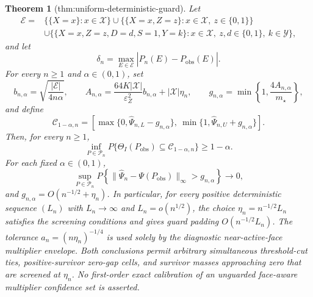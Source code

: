 \documentclass{article}
\newtheorem{theorem}{Theorem}
\begin{document}
\begin{theorem}[thm:uniform-deterministic-guard]\label{thm:uniform-deterministic-guard}
Let
\[
\begin{aligned}
\mathcal E={}&\bigl\{\{X=x\}:x\in\mathcal X\bigr\}
\cup\bigl\{\{X=x,Z=z\}:x\in\mathcal X,\ z\in\{0,1\}\bigr\}\\
&\cup\bigl\{\{X=x,Z=z,D=d,S=1,Y=k\}:x\in\mathcal X,\ z,d\in\{0,1\},\ k\in\mathcal Y\bigr\},
\end{aligned}
\]
and let
\[
\delta_n=\max_{E\in\mathcal E}\left|\widehat P_n(E)-P_{\mathrm{obs}}(E)\right|.
\]
For every \(n\ge1\) and \(\alpha\in(0,1)\), set
\[
b_{n,\alpha}=\sqrt{\frac{|\mathcal E|}{4n\alpha}},\qquad
A_{n,\alpha}=\frac{64K|\mathcal X|}{\varepsilon_Z^2}b_{n,\alpha}+|\mathcal X|\eta_n,
\qquad
g_{n,\alpha}=\min\left\{1,\frac{4A_{n,\alpha}}{m_{\star}}\right\},
\]
and define
\[
\mathcal C_{1-\alpha,n}
=\left[\max\{0,\widehat\Psi_{n,L}-g_{n,\alpha}\},\
\min\{1,\widehat\Psi_{n,U}+g_{n,\alpha}\}\right].
\]
Then, for every \(n\ge1\),
\[
\inf_{P\in\mathcal P_n}P\{\Theta_I(P_{\mathrm{obs}})\subseteq\mathcal C_{1-\alpha,n}\}\ge1-\alpha.
\]
For each fixed \(\alpha\in(0,1)\),
\[
\sup_{P\in\mathcal P_n}
P\!\left\{\|\widehat\Psi_n-\Psi(P_{\mathrm{obs}})\|_\infty>g_{n,\alpha}\right\}\longrightarrow0,
\]
and \(g_{n,\alpha}=O(n^{-1/2}+\eta_n)\).  In particular, for every positive deterministic sequence \((L_n)\) with \(L_n\to\infty\) and \(L_n=o(n^{1/2})\), the choice \(\eta_n=n^{-1/2}L_n\) satisfies the screening conditions and gives guard padding \(O(n^{-1/2}L_n)\).  The tolerance \(a_n=(n\eta_n)^{-1/4}\) is used solely by the diagnostic near-active-face multiplier envelope.  Both conclusions permit arbitrary simultaneous threshold-cut ties, positive-survivor zero-gap cells, and survivor masses approaching zero that are screened at \(\eta_n\).  No first-order exact calibration of an unguarded face-aware multiplier confidence set is asserted.
\end{theorem}
\end{document}
